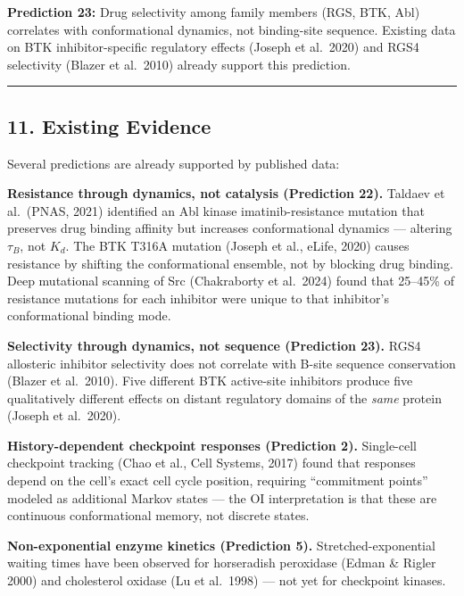 \documentclass[
  11pt,
]{article}
\begin{document}
\textbf{Prediction 23:} Drug selectivity among family members (RGS, BTK,
Abl) correlates with conformational dynamics, not binding-site sequence.
Existing data on BTK inhibitor-specific regulatory effects (Joseph et
al.~2020) and RGS4 selectivity (Blazer et al.~2010) already support this
prediction.

\begin{center}\rule{0.5\linewidth}{0.5pt}\end{center}

\hypertarget{existing-evidence}{%
\subsection{11. Existing Evidence}\label{existing-evidence}}

Several predictions are already supported by published data:

\textbf{Resistance through dynamics, not catalysis (Prediction 22).}
Taldaev et al.~(PNAS, 2021) identified an Abl kinase imatinib-resistance
mutation that preserves drug binding affinity but increases
conformational dynamics --- altering \(\tau_B\), not \(K_d\). The BTK
T316A mutation (Joseph et al., eLife, 2020) causes resistance by
shifting the conformational ensemble, not by blocking drug binding. Deep
mutational scanning of Src (Chakraborty et al.~2024) found that 25--45\%
of resistance mutations for each inhibitor were unique to that
inhibitor's conformational binding mode.

\textbf{Selectivity through dynamics, not sequence (Prediction 23).}
RGS4 allosteric inhibitor selectivity does not correlate with B-site
sequence conservation (Blazer et al.~2010). Five different BTK
active-site inhibitors produce five qualitatively different effects on
distant regulatory domains of the \emph{same} protein (Joseph et
al.~2020).

\textbf{History-dependent checkpoint responses (Prediction 2).}
Single-cell checkpoint tracking (Chao et al., Cell Systems, 2017) found
that responses depend on the cell's exact cell cycle position, requiring
``commitment points'' modeled as additional Markov states --- the OI
interpretation is that these are continuous conformational memory, not
discrete states.

\textbf{Non-exponential enzyme kinetics (Prediction 5).}
Stretched-exponential waiting times have been observed for horseradish
peroxidase (Edman \& Rigler 2000) and cholesterol oxidase (Lu et
al.~1998) --- not yet for checkpoint kinases.
\end{document}
